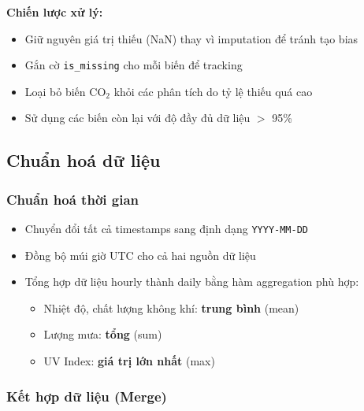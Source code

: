 \documentclass[12pt,a4paper]{article}
\newcommand{\cotwo}{CO$_2$}
\begin{document}
\textbf{Chiến lược xử lý:}
\begin{itemize}
    \item Giữ nguyên giá trị thiếu (NaN) thay vì imputation để tránh tạo bias
    \item Gắn cờ \texttt{is\_missing} cho mỗi biến để tracking
    \item Loại bỏ biến \cotwo{} khỏi các phân tích do tỷ lệ thiếu quá cao
    \item Sử dụng các biến còn lại với độ đầy đủ dữ liệu $>$ 95\%
\end{itemize}

\subsection{Chuẩn hoá dữ liệu}

\subsubsection{Chuẩn hoá thời gian}
\begin{itemize}
    \item Chuyển đổi tất cả timestamps sang định dạng \texttt{YYYY-MM-DD}
    \item Đồng bộ múi giờ UTC cho cả hai nguồn dữ liệu
    \item Tổng hợp dữ liệu hourly thành daily bằng hàm aggregation phù hợp:
    \begin{itemize}
        \item Nhiệt độ, chất lượng không khí: \textbf{trung bình} (mean)
        \item Lượng mưa: \textbf{tổng} (sum)
        \item UV Index: \textbf{giá trị lớn nhất} (max)
    \end{itemize}
\end{itemize}

\subsubsection{Kết hợp dữ liệu (Merge)}
\end{document}

